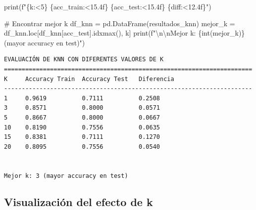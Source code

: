 \documentclass[
  doc,
  floatsintext,
  longtable,
  a4paper,
  nolmodern,
  notxfonts,
  notimes,
  12pt,
  colorlinks=true,linkcolor=blue,citecolor=blue,urlcolor=blue]{apa7}
\newenvironment{Shaded}{\begin{snugshade}}{\end{snugshade}}
\newcommand{\BuiltInTok}[1]{\textcolor[rgb]{0.00,0.23,0.31}{#1}}
\newcommand{\CharTok}[1]{\textcolor[rgb]{0.13,0.47,0.30}{#1}}
\newcommand{\CommentTok}[1]{\textcolor[rgb]{0.37,0.37,0.37}{#1}}
\newcommand{\NormalTok}[1]{\textcolor[rgb]{0.00,0.23,0.31}{#1}}
\newcommand{\OperatorTok}[1]{\textcolor[rgb]{0.37,0.37,0.37}{#1}}
\newcommand{\SpecialCharTok}[1]{\textcolor[rgb]{0.37,0.37,0.37}{#1}}
\newcommand{\SpecialStringTok}[1]{\textcolor[rgb]{0.13,0.47,0.30}{#1}}
\newcommand{\StringTok}[1]{\textcolor[rgb]{0.13,0.47,0.30}{#1}}
\begin{document}
\begin{Shaded}
\begin{Highlighting}[]
    \BuiltInTok{print}\NormalTok{(}\SpecialStringTok{f"}\SpecialCharTok{\{}\NormalTok{k}\SpecialCharTok{:\textless{}5\}}\SpecialStringTok{ }\SpecialCharTok{\{}\NormalTok{acc\_train}\SpecialCharTok{:\textless{}15.4f\}}\SpecialStringTok{ }\SpecialCharTok{\{}\NormalTok{acc\_test}\SpecialCharTok{:\textless{}15.4f\}}\SpecialStringTok{ }\SpecialCharTok{\{}\NormalTok{diff}\SpecialCharTok{:\textless{}12.4f\}}\SpecialStringTok{"}\NormalTok{)}

\CommentTok{\# Encontrar mejor k}
\NormalTok{df\_knn }\OperatorTok{=}\NormalTok{ pd.DataFrame(resultados\_knn)}
\NormalTok{mejor\_k }\OperatorTok{=}\NormalTok{ df\_knn.loc[df\_knn[}\StringTok{\textquotesingle{}acc\_test\textquotesingle{}}\NormalTok{].idxmax(), }\StringTok{\textquotesingle{}k\textquotesingle{}}\NormalTok{]}
\BuiltInTok{print}\NormalTok{(}\SpecialStringTok{f"}\CharTok{\textbackslash{}n\textbackslash{}n}\SpecialStringTok{Mejor k: }\SpecialCharTok{\{}\BuiltInTok{int}\NormalTok{(mejor\_k)}\SpecialCharTok{\}}\SpecialStringTok{ (mayor accuracy en test)"}\NormalTok{)}
\end{Highlighting}
\end{Shaded}

\begin{verbatim}
EVALUACIÓN DE KNN CON DIFERENTES VALORES DE K
======================================================================
K     Accuracy Train  Accuracy Test   Diferencia  
----------------------------------------------------------------------
1     0.9619          0.7111          0.2508      
3     0.8571          0.8000          0.0571      
5     0.8667          0.8000          0.0667      
10    0.8190          0.7556          0.0635      
15    0.8381          0.7111          0.1270      
20    0.8095          0.7556          0.0540      


Mejor k: 3 (mayor accuracy en test)
\end{verbatim}

\subsection{Visualización del efecto de
k}\label{visualizaciuxf3n-del-efecto-de-k}
\end{document}

